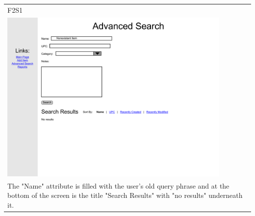 \documentclass{article}
\begin{document}
~\\
~\\
\begin{tabular}{ p{4.5in} }
F2S1\\
\includegraphics[keepaspectratio, width=4.5in]{basicSearchF2S1.pdf} \\
The "Name" attribute is filled with the user's old query phrase and at the bottom of the screen is the title "Search Results" with "no results" underneath it.
\end{tabular}
\end{document}
